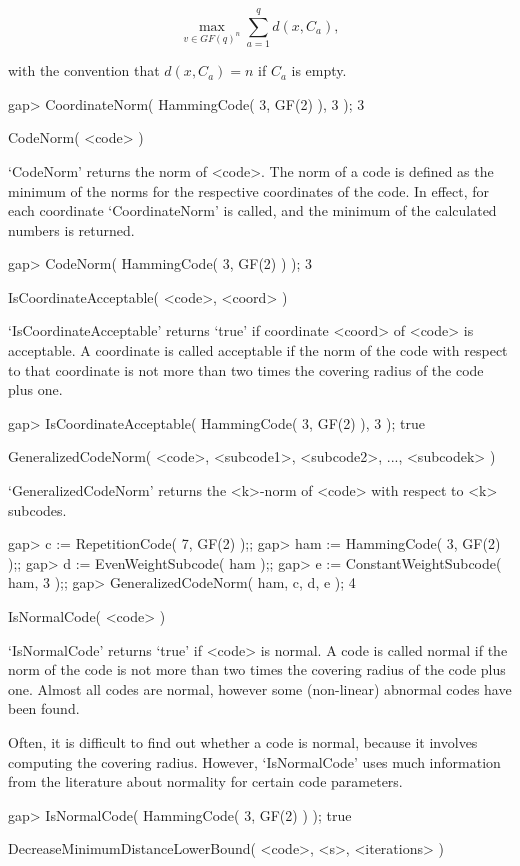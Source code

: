 $$
\max_{v \in GF(q)^n} \sum_{a=1}^q d(x,C_a),
$$

with the convention that $d(x,C_a) = n$ if $C_a$ is empty.

\beginexample
gap> CoordinateNorm( HammingCode( 3, GF(2) ), 3 );
3 
\endexample

\>CodeNorm( <code> )

`CodeNorm' returns the norm of <code>. The norm of a code is  defined  as
the minimum of the norms for the respective coordinates of the  code.  In
effect, for each coordinate `CoordinateNorm' is called, and  the  minimum
of the calculated numbers is returned.

\beginexample
gap> CodeNorm( HammingCode( 3, GF(2) ) );
3 
\endexample

\>IsCoordinateAcceptable( <code>, <coord> )

`IsCoordinateAcceptable' returns `true' if
coordinate <coord> of <code> is acceptable.
A coordinate is called acceptable if the norm of
the code with respect to that coordinate is
not more than two times the covering radius of
the code plus one.

\beginexample
gap> IsCoordinateAcceptable( HammingCode( 3, GF(2) ), 3 );
true 
\endexample

\>GeneralizedCodeNorm( <code>, <subcode1>, <subcode2>, ..., <subcodek> )

`GeneralizedCodeNorm' returns the <k>-norm of <code> with
respect to <k> subcodes.

\beginexample
gap> c := RepetitionCode( 7, GF(2) );;
gap> ham := HammingCode( 3, GF(2) );;
gap> d := EvenWeightSubcode( ham );;
gap> e := ConstantWeightSubcode( ham, 3 );;
gap> GeneralizedCodeNorm( ham, c, d, e );
4 
\endexample

\>IsNormalCode( <code> )

`IsNormalCode' returns `true' if <code>  is  normal.  A  code  is  called
normal if the norm of the code is not more than two  times  the  covering
radius of the code plus one. Almost all codes are  normal,  however  some
(non-linear) abnormal codes have been found.

Often, it is difficult to find out whether a code is normal,  because  it
involves computing the covering radius. However, `IsNormalCode' uses much
information  from  the  literature  about  normality  for  certain   code
parameters.

\beginexample
gap> IsNormalCode( HammingCode( 3, GF(2) ) );
true 
\endexample

\>DecreaseMinimumDistanceLowerBound( <code>, <s>, <iterations> )

